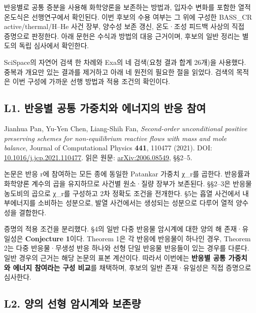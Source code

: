 반응별로 공통 증분을 사용해 화학양론을 보존하는 방법과, 입자수 변화를 포함한 열적 온도식은 선행연구에서 확인된다. 이번 후보의 수용 여부는 그 위에 구성한 BASS\_CR active/thermal/H--He 사건 장부, 양수성 보존 갱신, 온도·조성 피드백 사상의 직접 증명으로 판정한다. 아래 문헌은 수식과 방법의 대응 근거이며, 후보의 일반 정리는 별도의 독립 심사에서 확인한다.

SciSpace의 자연어 검색 한 차례와 Exa의 네 검색(요청 결과 합계 26개)을 사용했다. 중복과 개요만 있는 결과를 제거하고 아래 네 원전의 필요한 절을 읽었다. 검색의 목적은 이번 구성에 가까운 선행 방법과 적용 조건의 확인이다.

\hypertarget{l1.-uxbc18uxc751uxbcc4-uxacf5uxd1b5-uxac00uxc911uxce58uxc640-uxc5d0uxb108uxc9c0uxc758-uxbc18uxc751-uxcc38uxc5ec}{%
\subsection{L1. 반응별 공통 가중치와 에너지의 반응 참여}\label{l1.-uxbc18uxc751uxbcc4-uxacf5uxd1b5-uxac00uxc911uxce58uxc640-uxc5d0uxb108uxc9c0uxc758-uxbc18uxc751-uxcc38uxc5ec}}

Jianhua Pan, Yu-Yen Chen, Liang-Shih Fan, \emph{Second-order unconditional positive preserving schemes for non-equilibrium reactive flows with mass and mole balance}, Journal of Computational Physics \textbf{441}, 110477 (2021). DOI: \href{https://doi.org/10.1016/j.jcp.2021.110477}{10.1016/j.jcp.2021.110477}. 읽은 원문: \href{https://ar5iv.labs.arxiv.org/html/2006.08549}{arXiv:2006.08549}, §§2--5.

논문은 반응 r에 참여하는 모든 종에 동일한 Patankar 가중치 χ\_r를 곱한다. 반응률과 화학양론 계수의 곱을 유지하므로 사건별 원소·질량 장부가 보존된다. §§2--3은 반응물 농도비의 곱으로 χ\_r를 구성하고 2차 정확도 조건을 전개한다. §5는 흡열 사건에서 내부에너지를 소비하는 성분으로, 발열 사건에서는 생성되는 성분으로 다루어 열적 양수성을 결합한다.

증명의 적용 조건을 분리했다. §4의 일반 다중 반응물 암시계에 대한 양의 해 존재·유일성은 \textbf{Conjecture 1}이다. Theorem 1은 각 반응에 반응물이 하나인 경우, Theorem 2는 다중 반응물·무생성 반응 하나와 선형 단일 반응물 반응들이 있는 경우를 다룬다. 일반 경우의 근거는 해당 논문의 표본 계산이다. 따라서 이번에는 \textbf{반응별 공통 가중치와 에너지 참여라는 구성 비교}를 채택하며, 후보의 일반 존재·유일성은 직접 증명으로 심사한다.

\hypertarget{l2.-uxc591uxc758-uxc120uxd615-uxc554uxc2dcuxacc4uxc640-uxbcf4uxc874uxb7c9}{%
\subsection{L2. 양의 선형 암시계와 보존량}\label{l2.-uxc591uxc758-uxc120uxd615-uxc554uxc2dcuxacc4uxc640-uxbcf4uxc874uxb7c9}}

